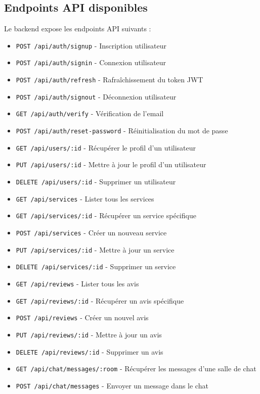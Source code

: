 \documentclass[12pt, a4paper]{article}
\begin{document}
\subsection{Endpoints API disponibles}
Le backend expose les endpoints API suivants :

\begin{multicols}{2}
\begin{itemize}
  \item \texttt{POST /api/auth/signup} - Inscription utilisateur
  \item \texttt{POST /api/auth/signin} - Connexion utilisateur
  \item \texttt{POST /api/auth/refresh} - Rafraîchissement du token JWT
  \item \texttt{POST /api/auth/signout} - Déconnexion utilisateur
  \item \texttt{GET /api/auth/verify} - Vérification de l'email
  \item \texttt{POST /api/auth/reset-password} - Réinitialisation du mot de passe
  \item \texttt{GET /api/users/:id} - Récupérer le profil d'un utilisateur
  \item \texttt{PUT /api/users/:id} - Mettre à jour le profil d'un utilisateur
  \item \texttt{DELETE /api/users/:id} - Supprimer un utilisateur
  \item \texttt{GET /api/services} - Lister tous les services
  \item \texttt{GET /api/services/:id} - Récupérer un service spécifique
  \item \texttt{POST /api/services} - Créer un nouveau service
  \item \texttt{PUT /api/services/:id} - Mettre à jour un service
  \item \texttt{DELETE /api/services/:id} - Supprimer un service
  \item \texttt{GET /api/reviews} - Lister tous les avis
  \item \texttt{GET /api/reviews/:id} - Récupérer un avis spécifique
  \item \texttt{POST /api/reviews} - Créer un nouvel avis
  \item \texttt{PUT /api/reviews/:id} - Mettre à jour un avis
  \item \texttt{DELETE /api/reviews/:id} - Supprimer un avis
  \item \texttt{GET /api/chat/messages/:room} - Récupérer les messages d'une salle de chat
  \item \texttt{POST /api/chat/messages} - Envoyer un message dans le chat

\end{itemize}
\end{multicols}
\end{document}
